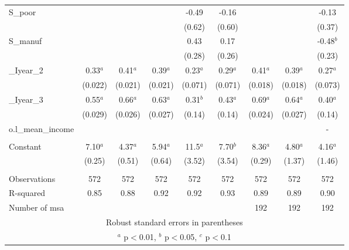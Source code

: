 \documentclass[]{article}
\begin{document}
\begin{tabular}{lcccccccc}
S\_poor &  &  &  & -0.49 & -0.16 &  &  & -0.13 \\
 &  &  &  & (0.62) & (0.60) &  &  & (0.37) \\
S\_manuf &  &  &  & 0.43 & 0.17 &  &  & -0.48$^b$ \\
 &  &  &  & (0.28) & (0.26) &  &  & (0.23) \\
\_Iyear\_2 & 0.33$^a$ & 0.41$^a$ & 0.39$^a$ & 0.23$^a$ & 0.29$^a$ & 0.41$^a$ & 0.39$^a$ & 0.27$^a$ \\
 & (0.022) & (0.021) & (0.021) & (0.071) & (0.071) & (0.018) & (0.018) & (0.073) \\
\_Iyear\_3 & 0.55$^a$ & 0.66$^a$ & 0.63$^a$ & 0.31$^b$ & 0.43$^a$ & 0.69$^a$ & 0.64$^a$ & 0.40$^a$ \\
 & (0.029) & (0.026) & (0.027) & (0.14) & (0.14) & (0.024) & (0.027) & (0.14) \\
o.l\_mean\_income &  &  &  &  &  &  &  & - \\
 &  &  &  &  &  &  &  &  \\
Constant & 7.10$^a$ & 4.37$^a$ & 5.94$^a$ & 11.5$^a$ & 7.70$^b$ & 8.36$^a$ & 4.80$^a$ & 4.16$^a$ \\
 & (0.25) & (0.51) & (0.64) & (3.52) & (3.54) & (0.29) & (1.37) & (1.46) \\
 &  &  &  &  &  &  &  &  \\
Observations & 572 & 572 & 572 & 572 & 572 & 572 & 572 & 572 \\
R-squared & 0.85 & 0.88 & 0.92 & 0.92 & 0.93 & 0.89 & 0.89 & 0.90 \\
 Number of msa &  &  &  &  &  & 192 & 192 & 192 \\ \hline
\multicolumn{9}{c}{ Robust standard errors in parentheses} \\
\multicolumn{9}{c}{ $^a$ p$<$0.01, $^b$ p$<$0.05, $^c$ p$<$0.1} \\
\end{tabular}
\end{document}
